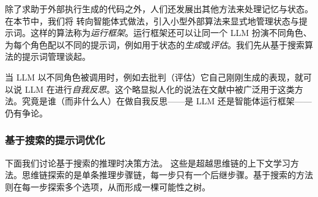 除了求助于外部执行生成的代码之外，人们还发展出其他方法来处理记忆与状态。在本节中，我们将%
转向智能体式做法，引入小型外部算法来显式地管理状态与提示词。这样的算法称为{\em 运行框架}。运行框架还可以让同一个 LLM 扮演不同角色、为每个角色配以不同的提示词，例如用于状态的{\em 生成}或{\em 评估}。我们先从基于搜索算法的提示词管理谈起。

当 LLM 以不同角色被调用时，例如去批判（评估）它自己刚刚生成的表现，就可以说 LLM 在进行{\em 自我反思}。这个略显拟人化的说法在文献中被广泛用于这类方法。究竟是谁（而非什么人）在做自我反思——是 LLM 还是智能体运行框架——仍有争论。


\subsubsection{基于搜索的提示词优化}\label{sec:planning}
下面我们讨论基于搜索的推理时决策方法。
这些是超越思维链的上下文学习方法。思维链探索的是单条推理步骤链，每一步只有一个后继步骤。基于搜索的方法则在每一步探索多个选项，从而形成一棵可能性之树。

